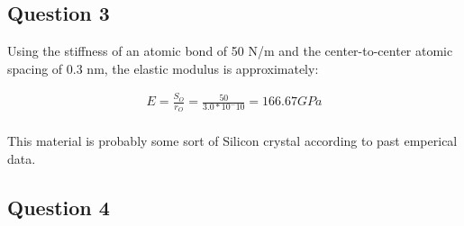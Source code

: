 \documentclass[12pt]{report}
\begin{document}
\subsection{Question 3}

Using the stiffness of an atomic bond of 50 N/m and the center-to-center atomic spacing of 0.3 nm, the elastic modulus is approximately:

\begin{equation}
\begin{split}
	E = \frac{S_O}{r_O} = \frac{50}{3.0*10^-10} = 166.67 GPa
	\label{equation:equation2}
\end{split}
\end{equation}
\\

This material is probably some sort of Silicon crystal according to past emperical data.

\subsection{Question 4}
\end{document}
